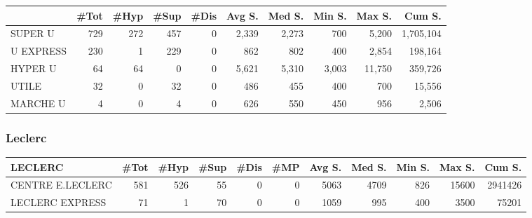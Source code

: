 \documentclass[11pt]{article}
\begin{document}
\begin{table}[H]
\footnotesize
\setlength{\tabcolsep}{2pt}

\begin{tabular}{lrrrrrrrrr}
\toprule
{} &       \#Tot &       \#Hyp &       \#Sup &       \#Dis &     Avg S. &     Med S. &     Min S. &     Max S. &     Cum S. \\
\midrule
SUPER U   &        729 &        272 &        457 &          0 &      2,339 &      2,273 &        700 &      5,200 &  1,705,104 \\
U EXPRESS &        230 &          1 &        229 &          0 &        862 &        802 &        400 &      2,854 &    198,164 \\
HYPER U   &         64 &         64 &          0 &          0 &      5,621 &      5,310 &      3,003 &     11,750 &    359,726 \\
UTILE     &         32 &          0 &         32 &          0 &        486 &        455 &        400 &        700 &     15,556 \\
MARCHE U  &          4 &          0 &          4 &          0 &        626 &        550 &        450 &        956 &      2,506 \\
\bottomrule
\end{tabular}

\end{table}


\subsubsection{Leclerc}

\begin{table}[H]
\footnotesize
\setlength{\tabcolsep}{2pt}

\begin{tabular}{lrrrrrrrrrr}
\toprule
LECLERC &       \#Tot &       \#Hyp &       \#Sup &       \#Dis &        \#MP &     Avg S. &     Med S. &     Min S. &     Max S. &     Cum S. \\
\midrule
CENTRE E.LECLERC &        581 &        526 &         55 &          0 &          0 &       5063 &       4709 &        826 &      15600 &    2941426 \\
LECLERC EXPRESS  &         71 &          1 &         70 &          0 &          0 &       1059 &        995 &        400 &       3500 &      75201 \\
\bottomrule
\end{tabular}

\end{table}
\end{document}
